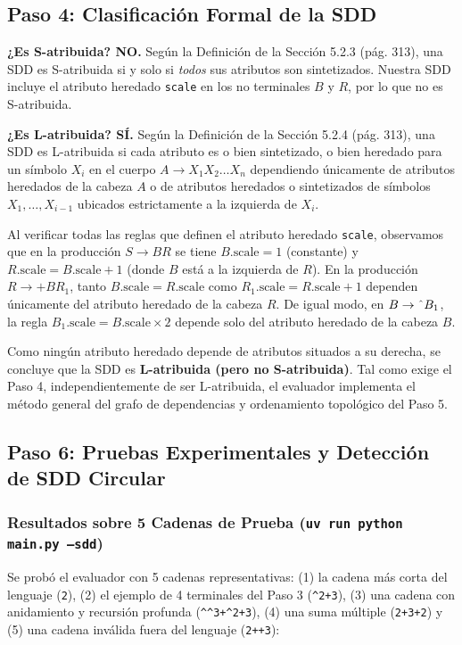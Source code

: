 \documentclass[11pt,a4paper]{article}
\begin{document}
\subsection{Paso 4: Clasificaci\'on Formal de la SDD}

\textbf{¿Es S-atribuida? NO.} Seg\'un la Definici\'on de la Secci\'on 5.2.3 (p\'ag. 313), una SDD es S-atribuida si y solo si \emph{todos} sus atributos son sintetizados. Nuestra SDD incluye el atributo heredado \texttt{scale} en los no terminales $B$ y $R$, por lo que no es S-atribuida.

\textbf{¿Es L-atribuida? S\'I.} Seg\'un la Definici\'on de la Secci\'on 5.2.4 (p\'ag. 313), una SDD es L-atribuida si cada atributo es o bien sintetizado, o bien heredado para un s\'imbolo $X_i$ en el cuerpo $A \to X_1 X_2 \dots X_n$ dependiendo \'unicamente de atributos heredados de la cabeza $A$ o de atributos heredados o sintetizados de s\'imbolos $X_1, \dots, X_{i-1}$ ubicados estrictamente a la izquierda de $X_i$.

Al verificar todas las reglas que definen el atributo heredado \texttt{scale}, observamos que en la producci\'on $S \to B R$ se tiene $B.\text{scale} = 1$ (constante) y $R.\text{scale} = B.\text{scale} + 1$ (donde $B$ est\'a a la izquierda de $R$). En la producci\'on $R \to + B R_1$, tanto $B.\text{scale} = R.\text{scale}$ como $R_1.\text{scale} = R.\text{scale} + 1$ dependen \'unicamente del atributo heredado de la cabeza $R$. De igual modo, en $B \to \text{\^{}} B_1$, la regla $B_1.\text{scale} = B.\text{scale} \times 2$ depende solo del atributo heredado de la cabeza $B$.

Como ning\'un atributo heredado depende de atributos situados a su derecha, se concluye que la SDD es \textbf{L-atribuida (pero no S-atribuida)}. Tal como exige el Paso 4, independientemente de ser L-atribuida, el evaluador implementa el m\'etodo general del grafo de dependencias y ordenamiento topol\'ogico del Paso 5.

\subsection{Paso 6: Pruebas Experimentales y Detecci\'on de SDD Circular}

\subsubsection{Resultados sobre 5 Cadenas de Prueba (\texttt{uv run python main.py --sdd})}
Se prob\'o el evaluador con 5 cadenas representativas: (1) la cadena m\'as corta del lenguaje (\texttt{2}), (2) el ejemplo de 4 terminales del Paso 3 (\texttt{\^{}2+3}), (3) una cadena con anidamiento y recursi\'on profunda (\texttt{\^{}\^{}3+\^{}2+3}), (4) una suma m\'ultiple (\texttt{2+3+2}) y (5) una cadena inv\'alida fuera del lenguaje (\texttt{2++3}):
\end{document}
